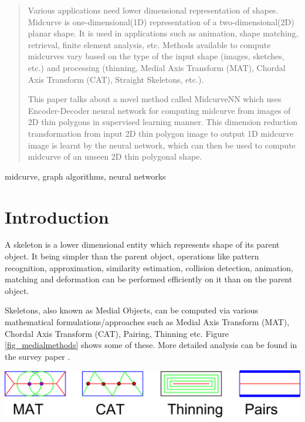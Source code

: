 \maketitle

\begin{abstract}
Various applications need lower dimensional representation of shapes. Midcurve is one-dimensional(1D) representation of a two-dimensional(2D) planar shape. It is used in applications such as animation, shape matching, retrieval, finite element analysis, etc. Methods available to compute midcurves vary based on the type of the input shape (images, sketches, etc.) and processing (thinning, Medial Axis Transform (MAT), Chordal Axis Transform (CAT), Straight Skeletons, etc.).

This paper talks about a novel method called MidcurveNN which uses Encoder-Decoder neural network for computing midcurve from images of 2D thin polygons in supervised learning manner. This dimension reduction transformation from input 2D thin polygon image to output 1D midcurve image is learnt by the neural network, which can then be used to compute midcurve of an unseen 2D thin polygonal shape. 
\end{abstract}


\begin{IEEEkeywords}
midcurve, graph algorithms, neural networks
\end{IEEEkeywords}

\section{Introduction}
A skeleton is a lower dimensional entity which represents shape of its parent object. It being simpler than the parent object, operations like pattern recognition, approximation, similarity estimation, collision detection, animation, matching and deformation can be performed efficiently on it than on the parent object. 

Skeletons, also known as Medial Objects, can be computed via various mathematical formulations/approaches such as Medial Axis Transform (MAT), Chordal Axis Transform (CAT), Pairing, Thinning etc. Figure \ref{fig_medialmethods} shows some of these. More detailed analysis can be found in the survey paper \cite{medial2010}.

    \begin{center}
	\includegraphics[width=\linewidth]{images/MedialMethodsOnlyShort}
	\label{fig_medialmethods}
    \end{center}
    

